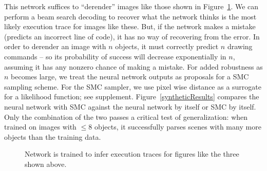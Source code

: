 \documentclass{article}
\begin{document}
This network suffices to ``derender'' images like those shown in
Figure~\ref{trainingData}.  We can perform a beam search decoding to
recover what the network thinks is the most likely execution trace for
images like these. But, if the network makes a mistake (predicts an
incorrect line of code), it has no way of recovering from the error.
In order to derender an image with $n$ objects, it must correctly
predict $n$ drawing commands -- so its probability of success will
decrease exponentially in $n$, assuming it has any nonzero chance of
making a mistake.  For added robustness as $n$ becomes large, we treat
the neural network outputs as proposals for a SMC sampling scheme.
For the SMC sampler, we use pixel wise distance as a surrogate for a
likelihood function; see supplement. Figure~\ref{syntheticResults}
compares the neural network with SMC against the neural network by
itself or SMC by itself.  Only the combination of the two passes a
critical test of generalization: when trained on images with $\leq 8$
objects, it successfully parses scenes with many more objects than the
training data.
\begin{figure}
  \begin{center}
    \begin{minipage}[t]{2.2cm}\end{minipage}
    \begin{minipage}[t]{2.2cm}\end{minipage}
    \begin{minipage}[t]{2.2cm}\end{minipage}
  \end{center}
  \caption{Network is trained to infer execution traces for figures like the three shown above.}\label{trainingData}
\end{figure}
\end{document}
